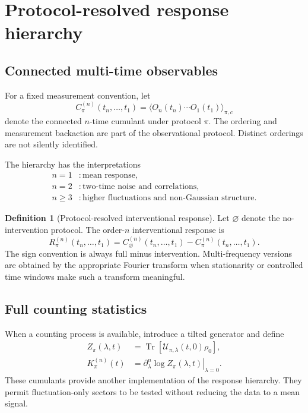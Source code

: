 \documentclass[11pt]{article}
\theoremstyle{definition}
\newtheorem{definition}[theorem]{Definition}
\theoremstyle{remark}
\DeclareMathOperator{\Tr}{Tr}
\newcommand{\cU}{\mathcal U}
\begin{document}
\section{Protocol-resolved response hierarchy}

\subsection{Connected multi-time observables}

For a fixed measurement convention, let
\begin{equation}
C_{\pi}^{(n)}(t_n,\ldots,t_1)
 = \bigl\langle O_n(t_n)\cdots O_1(t_1)\bigr\rangle_{\pi,c}
\label{eq:connected-cumulant}
\end{equation}
denote the connected $n$-time cumulant under protocol $\pi$. The ordering and measurement backaction are part of the observational protocol. Distinct orderings are not silently identified.

The hierarchy has the interpretations
\begin{equation}
\begin{aligned}
 n=1 &: \text{mean response},\\
 n=2 &: \text{two-time noise and correlations},\\
 n\ge3 &: \text{higher fluctuations and non-Gaussian structure}.
\end{aligned}
\end{equation}

\begin{definition}[Protocol-resolved interventional response]\label{def:response}
Let $\varnothing$ denote the no-intervention protocol. The order-$n$ interventional response is
\begin{equation}
\boxed{
R_{\pi}^{(n)}(t_n,\ldots,t_1)
 = C_{\varnothing}^{(n)}(t_n,\ldots,t_1)
 - C_{\pi}^{(n)}(t_n,\ldots,t_1).
}
\label{eq:general-response}
\end{equation}
The sign convention is always full minus intervention. Multi-frequency versions are obtained by the appropriate Fourier transform when stationarity or controlled time windows make such a transform meaningful.
\end{definition}

\subsection{Full counting statistics}

When a counting process is available, introduce a tilted generator and define
\begin{align}
Z_{\pi}(\lambda,t)
 &= \Tr\!\left[\cU_{\pi,\lambda}(t,0)\rho_0\right],\\
K_{\pi}^{(n)}(t)
 &= \left.\partial_{\lambda}^{n}\log Z_{\pi}(\lambda,t)\right|_{\lambda=0}.
\label{eq:fcs}
\end{align}
These cumulants provide another implementation of the response hierarchy.  They permit fluctuation-only sectors to be tested without reducing the data to a mean signal.
\end{document}
